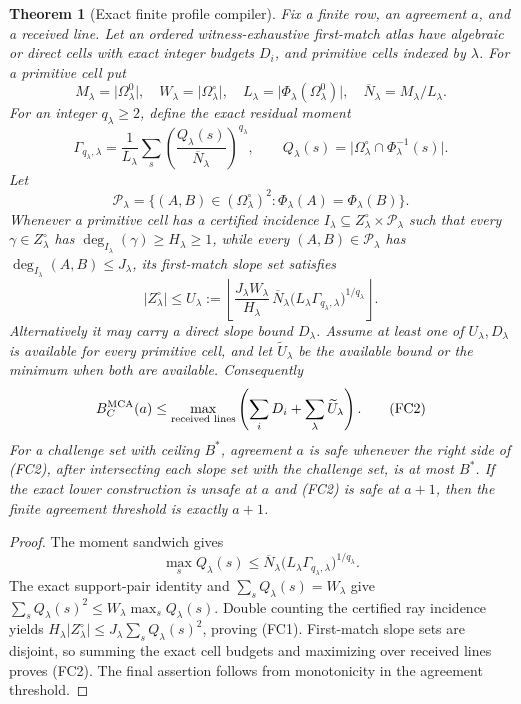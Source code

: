 \documentclass[12pt,a4paper]{amsart}
\numberwithin{equation}{section}
\newtheorem{theorem}{Theorem}[section]
\theoremstyle{remark}
\newcommand{\Omc}{\Omega^{\circ}}
\newcommand{\Pcal}{\mathcal P}
\newcommand{\barN}{\overline N}
\newcommand{\abs}[1]{\lvert #1\rvert}
\newcommand{\floor}[1]{\left\lfloor #1\right\rfloor}
\begin{document}
\begin{theorem}[Exact finite profile compiler]
\label{thm:exact-finite-profile-compiler}
Fix a finite row, an agreement \(a\), and a received line.  Let an ordered
witness-exhaustive first-match atlas have algebraic or direct cells with
exact integer budgets \(D_i\), and primitive cells indexed by \(\lambda\).
For a primitive cell put
\[
 M_\lambda=\abs{\Omega^0_\lambda},\quad
 W_\lambda=\abs{\Omc_\lambda},\quad
 L_\lambda=\abs{\Phi_\lambda(\Omega^0_\lambda)},\quad
 \barN_\lambda=M_\lambda/L_\lambda.
\]
For an integer \(q_\lambda\ge2\), define the exact residual moment
\[
 \Gamma_{q_\lambda,\lambda}
 =\frac1{L_\lambda}\sum_s
 \left(\frac{Q_\lambda(s)}{\barN_\lambda}\right)^{q_\lambda},
 \qquad
 Q_\lambda(s)=\abs{\Omc_\lambda\cap\Phi_\lambda^{-1}(s)}.
\]
Let
\[
 \Pcal_\lambda=
 \{(A,B)\in(\Omc_\lambda)^2:
              \Phi_\lambda(A)=\Phi_\lambda(B)\}.
\]
Whenever a primitive cell has a certified incidence
\(I_\lambda\subseteq Z_\lambda^\circ\times\Pcal_\lambda\) such that
every \(\gamma\in Z_\lambda^\circ\) has
\(\deg_{I_\lambda}(\gamma)\ge H_\lambda\ge1\), while every
\((A,B)\in\Pcal_\lambda\) has
\(\deg_{I_\lambda}(A,B)\le J_\lambda\), its first-match slope set
satisfies
\[
 \abs{Z_\lambda^\circ}
 \le U_\lambda:=
 \floor{\frac{J_\lambda W_\lambda}{H_\lambda}\,
 \barN_\lambda
 \bigl(L_\lambda\Gamma_{q_\lambda,\lambda}\bigr)^{1/q_\lambda}}.
 \tag{FC1}
\]
Alternatively it may carry a direct slope bound \(D_\lambda\).  Assume at
least one of \(U_\lambda,D_\lambda\) is available for every primitive
cell, and let \(\widetilde U_\lambda\) be the available bound or the
minimum when both are available.  Consequently
\[
 B_C^{\rm MCA}(a)
 \le \max_{\textup{received lines}}
 \left(\sum_iD_i+\sum_\lambda\widetilde U_\lambda\right).       \tag{FC2}
\]
For a challenge set with ceiling \(B^*\), agreement \(a\) is safe whenever
the right side of \textup{(FC2)}, after intersecting each slope set with
the challenge set, is at most \(B^*\).  If the exact lower construction is
unsafe at \(a\) and \textup{(FC2)} is safe at \(a+1\), then the finite
agreement threshold is exactly \(a+1\).
\end{theorem}

\begin{proof}
The moment sandwich gives
\[
 \max_sQ_\lambda(s)
 \le\barN_\lambda
      \bigl(L_\lambda\Gamma_{q_\lambda,\lambda}\bigr)^{1/q_\lambda}.
\]
The exact support-pair identity and
\(\sum_sQ_\lambda(s)=W_\lambda\) give
\(\sum_sQ_\lambda(s)^2\le
W_\lambda\max_sQ_\lambda(s)\).  Double counting the certified ray
incidence yields
\(H_\lambda\abs{Z_\lambda^\circ}
 \le J_\lambda\sum_sQ_\lambda(s)^2\), proving \textup{(FC1)}.
First-match slope sets are disjoint, so summing the exact cell budgets and
maximizing over received lines proves \textup{(FC2)}.  The final assertion
follows from monotonicity in the agreement threshold.
\end{proof}
\end{document}
